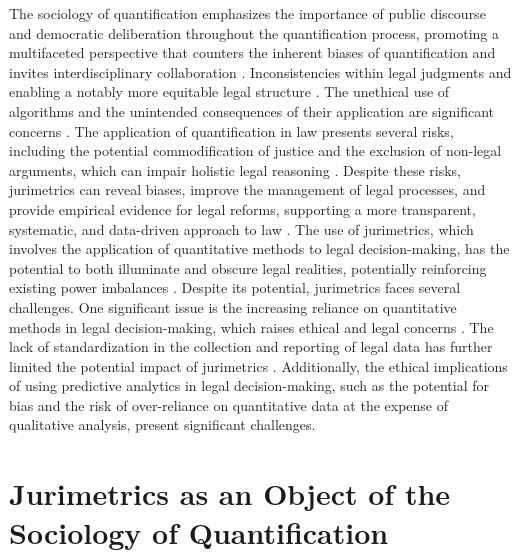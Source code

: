 The sociology of quantification emphasizes the importance of public discourse and democratic deliberation throughout the quantification process, promoting a multifaceted perspective that counters the inherent biases of quantification and invites interdisciplinary collaboration \cite{10.1590/dados.2022.65.3.267,10.1080/07329113.2015.1046739}. Inconsistencies within legal judgments and enabling a notably more equitable legal structure \cite{10.1007/s11186-021-09453-1,10.5040/9781350220645}. The unethical use of algorithms and the unintended consequences of their application are significant concerns \cite{10.1057/s41599-020-0396-5,10.1057/s41599-020-00557}. The application of quantification in law presents several risks, including the potential commodification of justice and the exclusion of non-legal arguments, which can impair holistic legal reasoning \cite{nunes2018, ribeiro1998}. Despite these risks, jurimetrics can reveal biases, improve the management of legal processes, and provide empirical evidence for legal reforms, supporting a more transparent, systematic, and data-driven approach to law \cite{ribeiro2021, nunes2018, silva2023}. The use of jurimetrics, which involves the application of quantitative methods to legal decision-making, has the potential to both illuminate and obscure legal realities, potentially reinforcing existing power imbalances \cite{10.1057/s41599-020-00557-0,10.1590/dados.2022.65.3.267}. Despite its potential, jurimetrics faces several challenges. One significant issue is the increasing reliance on quantitative methods in legal decision-making, which raises ethical and legal concerns \cite{jurimetricschallenges}. The lack of standardization in the collection and reporting of legal data has further limited the potential impact of jurimetrics \cite{jurimetricschallenges}. Additionally, the ethical implications of using predictive analytics in legal decision-making, such as the potential for bias and the risk of over-reliance on quantitative data at the expense of qualitative analysis, present significant challenges.

\section{Jurimetrics as an Object of the Sociology of Quantification}
